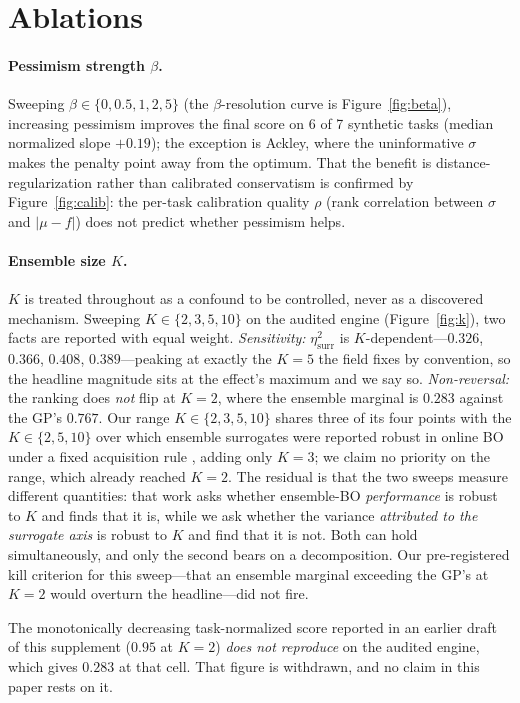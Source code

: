 \documentclass[letterpaper]{article}
\theoremstyle{plain}
\begin{document}
\section{Ablations}
\paragraph{Pessimism strength $\beta$.} Sweeping $\beta\in\{0,0.5,1,2,5\}$ (the $\beta$-resolution curve is Figure~\ref{fig:beta}), increasing pessimism improves the final score on 6 of 7 synthetic tasks (median normalized slope $+0.19$); the exception is Ackley, where the uninformative $\sigma$ makes the penalty point away from the optimum. That the benefit is distance-regularization rather than calibrated conservatism is confirmed by Figure~\ref{fig:calib}: the per-task calibration quality $\rho$ (rank correlation between $\sigma$ and $|\mu-f|$) does not predict whether pessimism helps.
\paragraph{Ensemble size $K$.} $K$ is treated throughout as a confound to be controlled, never as a discovered mechanism. Sweeping $K\in\{2,3,5,10\}$ on the audited engine (Figure~\ref{fig:k}), two facts are reported with equal weight. \emph{Sensitivity:} $\eta^2_{\text{surr}}$ is $K$-dependent---$0.326$, $0.366$, $0.408$, $0.389$---peaking at exactly the $K{=}5$ the field fixes by convention, so the headline magnitude sits at the effect's maximum and we say so. \emph{Non-reversal:} the ranking does \emph{not} flip at $K{=}2$, where the ensemble marginal is $0.283$ against the GP's $0.767$. Our range $K\in\{2,3,5,10\}$ shares three of its four points with the $K\in\{2,5,10\}$ over which ensemble surrogates were reported robust in online BO under a fixed acquisition rule \citep{li2024bnnsurrogates}, adding only $K{=}3$; we claim no priority on the range, which already reached $K{=}2$. The residual is that the two sweeps measure different quantities: that work asks whether ensemble-BO \emph{performance} is robust to $K$ and finds that it is, while we ask whether the variance \emph{attributed to the surrogate axis} is robust to $K$ and find that it is not. Both can hold simultaneously, and only the second bears on a decomposition. Our pre-registered kill criterion for this sweep---that an ensemble marginal exceeding the GP's at $K{=}2$ would overturn the headline---did not fire.

The monotonically decreasing task-normalized score reported in an earlier draft of this supplement ($0.95$ at $K{=}2$) \emph{does not reproduce} on the audited engine, which gives $0.283$ at that cell. That figure is withdrawn, and no claim in this paper rests on it.
\end{document}
